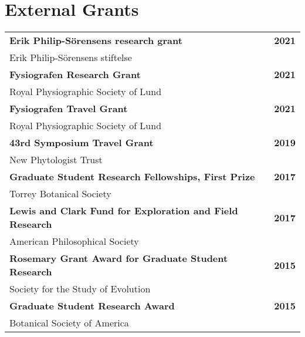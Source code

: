 \documentclass[letterpaper,11pt]{article}
\begin{document}
\section{External Grants}
\begin{tabular*}{1.0\textwidth}[t]{l@{\extracolsep{\fill}}r}

\textbf{Erik Philip-Sörensens research grant} & {\textbf{2021}}\\
Erik Philip-Sörensens stiftelse\vspace{7pt}\\

\textbf{Fysiografen Research Grant} & {\textbf{2021}}\\
Royal Physiographic Society of Lund\vspace{7pt}\\

\textbf{Fysiografen Travel Grant} & {\textbf{2021}}\\
Royal Physiographic Society of Lund\vspace{7pt}\\

\textbf{43rd Symposium Travel Grant} & {\textbf{2019}}\\
New Phytologist Trust\vspace{7pt}\\

\textbf{Graduate Student Research Fellowships, First Prize} & {\textbf{2017}}\\
Torrey Botanical Society\vspace{7pt}\\

\textbf{Lewis and Clark Fund for Exploration and Field Research} & {\textbf{2017}}\\
American Philosophical Society\vspace{7pt}\\

\textbf{Rosemary Grant Award for Graduate Student Research} & {\textbf{2015}}\\
Society for the Study of Evolution\vspace{7pt}\\

\textbf{Graduate Student Research Award} & {\textbf{2015}}\\
Botanical Society of America\\
\end{tabular*}
\end{document}
